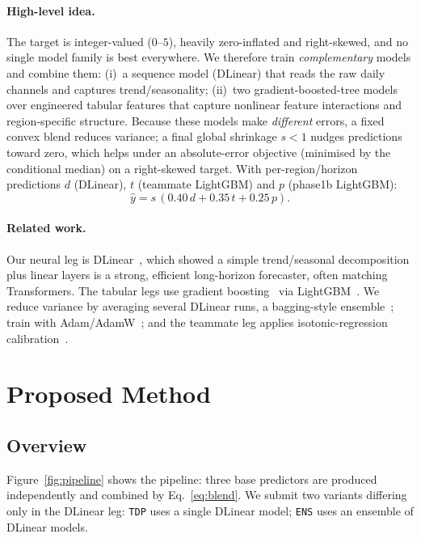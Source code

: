 \documentclass[11pt]{article}
\begin{document}
\paragraph{High-level idea.}
The target is integer-valued ($0$--$5$), heavily zero-inflated and right-skewed, and no single
model family is best everywhere. We therefore train \emph{complementary} models and combine them:
(i)~a sequence model (DLinear) that reads the raw daily channels and captures trend/seasonality;
(ii)~two gradient-boosted-tree models over engineered tabular features that capture nonlinear
feature interactions and region-specific structure. Because these models make \emph{different}
errors, a fixed convex blend reduces variance; a final global shrinkage $s<1$ nudges predictions
toward zero, which helps under an absolute-error objective (minimised by the conditional median)
on a right-skewed target. With per-region/horizon predictions $d$ (DLinear), $t$ (teammate
LightGBM) and $p$ (phase1b LightGBM):
\begin{equation}
\hat{y}=s\,(0.40\,d+0.35\,t+0.25\,p).
\label{eq:blend}
\end{equation}

\paragraph{Related work.}
Our neural leg is DLinear~\citep{zeng2023dlinear}, which showed a simple trend/seasonal
decomposition plus linear layers is a strong, efficient long-horizon forecaster, often matching
Transformers. The tabular legs use gradient boosting~\citep{friedman2001gbm} via
LightGBM~\citep{ke2017lightgbm}. We reduce variance by averaging several DLinear runs, a
bagging-style ensemble~\citep{breiman1996bagging}; train with Adam/AdamW~\citep{kingma2015adam,
loshchilov2019adamw}; and the teammate leg applies isotonic-regression
calibration~\citep{zadrozny2002isotonic}.

\section{Proposed Method}

\subsection{Overview}
Figure~\ref{fig:pipeline} shows the pipeline: three base predictors are produced independently
and combined by Eq.~\eqref{eq:blend}. We submit two variants differing only in the DLinear leg:
\texttt{TDP} uses a single DLinear model; \texttt{ENS} uses an ensemble of DLinear models.
\end{document}
